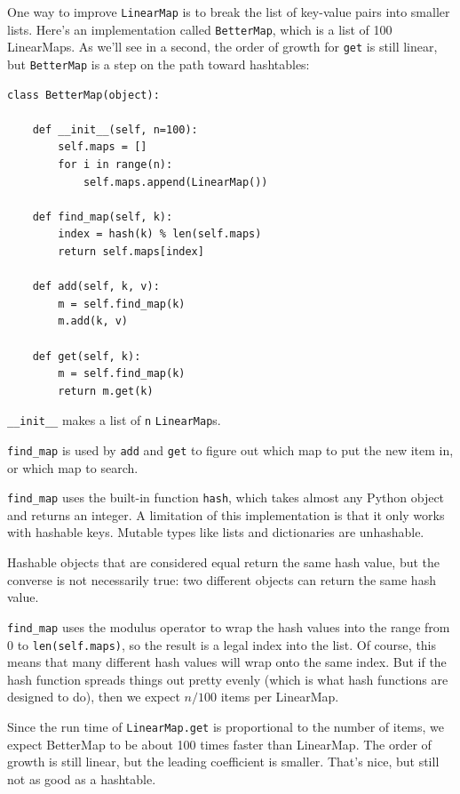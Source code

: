 \documentclass[10pt]{book}
\begin{document}
One way to improve {\tt LinearMap} is to break the list of key-value
pairs into smaller lists.  Here's an implementation called
{\tt BetterMap}, which is a list of 100 LinearMaps.  As we'll see
in a second, the order of growth for {\tt get} is still linear,
but {\tt BetterMap} is a step on the path toward hashtables:

\begin{verbatim}
class BetterMap(object):

    def __init__(self, n=100):
        self.maps = []
        for i in range(n):
            self.maps.append(LinearMap())

    def find_map(self, k):
        index = hash(k) % len(self.maps)
        return self.maps[index]

    def add(self, k, v):
        m = self.find_map(k)
        m.add(k, v)

    def get(self, k):
        m = self.find_map(k)
        return m.get(k)
\end{verbatim}

\verb"__init__" makes a list of {\tt n} {\tt LinearMap}s.

\verb"find_map" is used by
{\tt add} and {\tt get}
to figure out which map to put the
new item in, or which map to search.

\verb"find_map" uses the built-in function {\tt hash}, which takes
almost any Python object and returns an integer.  A limitation of this
implementation is that it only works with hashable keys.  Mutable
types like lists and dictionaries are unhashable.

Hashable objects that are considered equal return the same hash value,
but the converse is not necessarily true: two different objects
can return the same hash value.

\verb"find_map" uses the modulus operator to wrap the hash values
into the range from 0 to {\tt len(self.maps)}, so the result is a legal
index into the list.  Of course, this means that many different
hash values will wrap onto the same index.  But if the hash function
spreads things out pretty evenly (which is what hash functions
are designed to do), then we expect $n/100$ items per LinearMap.

Since the run time of {\tt LinearMap.get} is proportional to the
number of items, we expect BetterMap to be about 100 times faster
than LinearMap.  The order of growth is still linear, but the
leading coefficient is smaller.  That's nice, but still not
as good as a hashtable.
\end{document}
